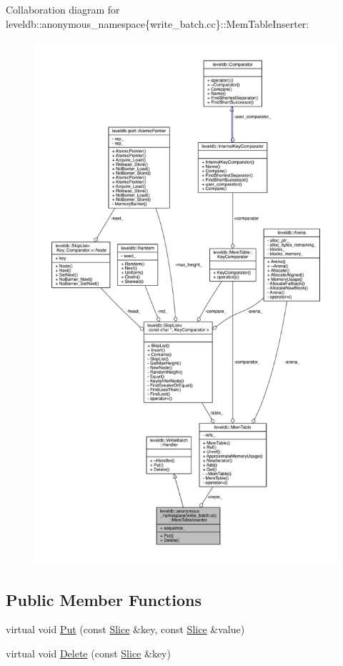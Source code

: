Collaboration diagram for leveldb\+:\+:anonymous\+\_\+namespace\{write\+\_\+batch.\+cc\}\+:\+:Mem\+Table\+Inserter\+:
\nopagebreak
\begin{figure}[H]
\begin{center}
\leavevmode
\includegraphics[height=550pt]{classleveldb_1_1anonymous__namespace_02write__batch_8cc_03_1_1_mem_table_inserter__coll__graph}
\end{center}
\end{figure}
\subsection*{Public Member Functions}
\begin{DoxyCompactItemize}
\item 
virtual void \hyperlink{classleveldb_1_1anonymous__namespace_02write__batch_8cc_03_1_1_mem_table_inserter_a2646adc17ca9d4faf8c1fbec0ca2b7ed}{Put} (const \hyperlink{classleveldb_1_1_slice}{Slice} \&key, const \hyperlink{classleveldb_1_1_slice}{Slice} \&value)
\item 
virtual void \hyperlink{classleveldb_1_1anonymous__namespace_02write__batch_8cc_03_1_1_mem_table_inserter_a97ff94d96a388e0736e7766e765678d3}{Delete} (const \hyperlink{classleveldb_1_1_slice}{Slice} \&key)
\end{DoxyCompactItemize}
